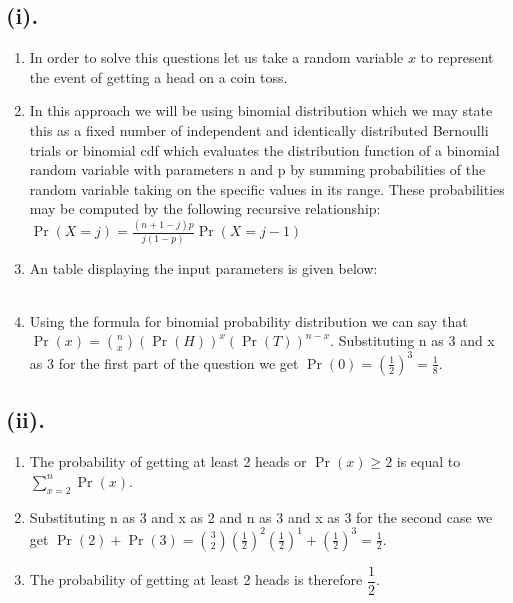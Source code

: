 \documentclass{article}
\begin{document}
	\subsection*{(i).}
	\begin{enumerate}
	    
		\item In order to solve this questions let us take a random variable $x$ to represent the event of getting a head on a coin toss.\\[6pt]
		
		\item In this approach we will be using binomial distribution which we may state this as a fixed number of independent and identically distributed Bernoulli trials or binomial cdf which evaluates the distribution function of a binomial random variable with parameters n and p by summing probabilities of the random variable taking on the specific values in its range. These probabilities may be computed by the following recursive relationship:\\[4pt]
 $\Pr(X=j)=\frac{(n+1-j)p}{j(1-p)}\Pr(X=j-1)$\\[4pt]
 \item An table displaying the input parameters is given below:\\[7pt]
 \\[4pt]
		
		
		\item Using the formula for binomial probability distribution we can say that $\Pr(x)={n\choose x}(\Pr(H))^x(\Pr(T))^{n-x}$. Substituting n as 3 and x as 3 for the first part of the question we get $\Pr(0)=(\frac{1}{2})^3=\frac{1}{8}$.
	\end{enumerate}
	
	\subsection*{(ii).}
	\begin{enumerate}
	  
		\item The probability of getting at least 2 heads or $\Pr(x)\geq 2$ is equal to $\sum_{x=2}^{n}\Pr(x)$. \\[4pt]
		\item Substituting n as 3 and x as 2 and n as 3 and x as 3 for the second case we get $\Pr(2)+\Pr(3)={3\choose 2}(\frac{1}{2})^2(\frac{1}{2})^1+(\frac{1}{2})^3=\frac{1}{2}$.\\[4pt]
		\item The probability of getting at least 2 heads is therefore $\dfrac{1}{2}$.
	\end{enumerate}
\end{document}
